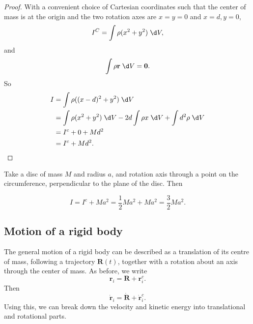 \documentclass[a4paper]{article}
\begin{document}
\begin{proof}
  With a convenient choice of Cartesian coordinates such that the center of mass is at the origin and the two rotation axes are $x = y =0$ and $x = d, y = 0$,
  \[
    I^C = \int \rho (x^2 + y^2) \;\d V,
  \]
  and
  \[
    \int \rho \mathbf{r}\;\d V = \mathbf{0}.
  \]
  So
  \begin{align*}
    I &= \int \rho((x - d)^2 + y^2)\;\d V\\
    &=\int \rho (x^2 + y^2)\;\d V - 2d\int \rho x\;\d V + \int d^2 \rho\;\d V\\
    &= I^c + 0 + Md^2\\
    &= I^c + Md^2.
  \end{align*}
\end{proof}

\begin{eg}
  Take a disc of mass $M$ and radius $a$, and rotation axis through a point on the circumference, perpendicular to the plane of the disc. Then
  \begin{center}
  \end{center}
  \[
    I = I^c + Ma^2 = \frac{1}{2}Ma^2 + Ma^2 = \frac{3}{2}Ma^2.
  \]
\end{eg}

\subsection{Motion of a rigid body}
The general motion of a rigid body can be described as a translation of its centre of mass, following a trajectory $\mathbf{R}(t)$, together with a rotation about an axis through the center of mass. As before, we write
\[
  \mathbf{r}_i = \mathbf{R} + \mathbf{r}_i^c.
\]
Then
\[
  \dot{\mathbf{r}}_i = \dot{\mathbf{R}} + \dot{\mathbf{r}}_i^c.
\]
Using this, we can break down the velocity and kinetic energy into translational and rotational parts.
\end{document}
